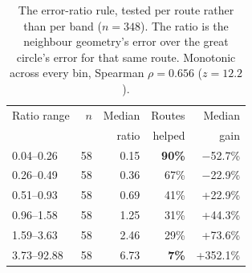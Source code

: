 \begin{table}[t]
\caption{The error-ratio rule, tested per route rather than per band
($n=348$). The ratio is the neighbour geometry's error over the great
circle's error for that same route. Monotonic across every bin, Spearman
$\rho=0.656$ ($z=12.2$).}
\label{tab:ratio}
\centering\footnotesize
\begin{tabular}{@{}lrrrr@{}}
\toprule
Ratio range & $n$ & Median & Routes & Median \\
 & & ratio & helped & gain \\
\midrule
0.04--0.26 & 58 & 0.15 & \textbf{90\%} & \ensuremath{-}52.7\% \\
0.26--0.49 & 58 & 0.36 & 67\% & \ensuremath{-}22.9\% \\
0.51--0.93 & 58 & 0.69 & 41\% & +22.9\% \\
0.96--1.58 & 58 & 1.25 & 31\% & +44.3\% \\
1.59--3.63 & 58 & 2.46 & 29\% & +73.6\% \\
3.73--92.88 & 58 & 6.73 & \textbf{7\%} & +352.1\% \\
\bottomrule
\end{tabular}
\end{table}
